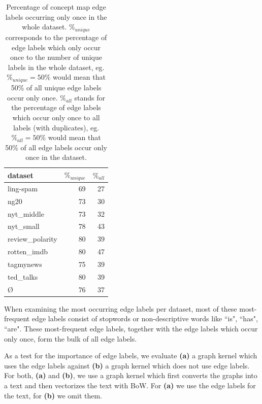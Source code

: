 \begin{table}[htb!]
	\centering
	\begin{tabular}{lrr}
		dataset &  $ \%_{unique} $ & $ \%_{all}$  \\
		\midrule
		ling-spam       & 69 & 27 \\
		ng20            & 73 & 30 \\
		nyt\_middle      & 73 & 32 \\
		nyt\_small       & 78 & 43 \\
		review\_polarity & 80 & 39 \\
		rotten\_imdb     & 80 & 47 \\
		tagmynews       & 75 & 39 \\
		ted\_talks       & 80 & 39 \\
		\midrule
		\O           & 76 & 37 \\
		\bottomrule
	\end{tabular}
	\caption[Statistics: Percentage of concept map labels occurring once]{Percentage of concept map edge labels occurring only once in the whole dataset.
		$ \%_{unique} $ corresponds to the percentage of edge labels which only occur once to the number of unique labels in the whole dataset, eg. $ \%_{unique} = 50\% $ would mean that 50\% of all unique edge labels occur only once.
		$ \%_{all}$ stands for the percentage of edge labels which occur only once to all labels (with duplicates), eg. $ \%_{all} = 50\%$ would mean that 50\% of all edge labels occur only once in the dataset.}\label{table:edge_label_occurrences}
\end{table}

When examining the most occurring edge labels per dataset, most of these most-frequent edge labels consist of stopwords or non-descriptive words like ``is", ``has", ``are".
These most-frequent edge labels, together with the edge labels which occur only once, form the bulk of all edge labels.

As a test for the importance of edge labels, we evaluate \textbf{(a)} a graph kernel which uses the edge labels against \textbf{(b)} a graph kernel which does not use edge labels.
For both, \textbf{(a)} and \textbf{(b)}, we use a graph kernel which first converts the graphs into a text and then vectorizes the text with BoW.
For \textbf{(a)} we use the edge labels for the text, for \textbf{(b)} we omit them.

